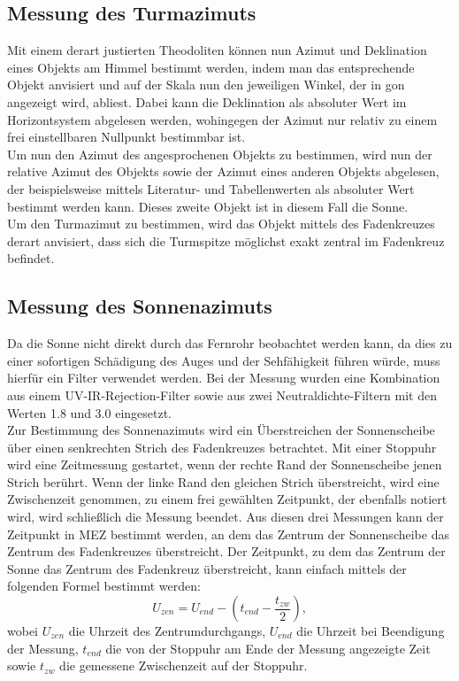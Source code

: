 \subsection{Messung des Turmazimuts}
Mit einem derart justierten Theodoliten können nun Azimut und Deklination eines Objekts am Himmel bestimmt werden, indem man das entsprechende Objekt anvisiert und auf der Skala nun den jeweiligen Winkel, der in gon angezeigt wird, abliest. Dabei kann die Deklination als absoluter Wert im Horizontsystem abgelesen werden, wohingegen der Azimut nur relativ zu einem frei einstellbaren Nullpunkt bestimmbar ist. \\
Um nun den Azimut des angesprochenen Objekts zu bestimmen, wird nun der relative Azimut des Objekts sowie der Azimut eines anderen Objekts abgelesen, der beispielsweise mittels Literatur- und Tabellenwerten als absoluter Wert bestimmt werden kann. Dieses zweite Objekt ist in diesem Fall die Sonne. \\
Um den Turmazimut zu bestimmen, wird das Objekt mittels des Fadenkreuzes derart anvisiert, dass sich die Turmspitze möglichst exakt zentral im Fadenkreuz befindet. \\

\subsection{Messung des Sonnenazimuts}
Da die Sonne nicht direkt durch das Fernrohr beobachtet werden kann, da dies zu einer sofortigen Schädigung des Auges und der Sehfähigkeit führen würde, muss hierfür ein Filter verwendet werden. Bei der Messung wurden eine Kombination aus einem UV-IR-Rejection-Filter sowie aus zwei Neutraldichte-Filtern mit den Werten 1.8 und 3.0 eingesetzt. \\ 
Zur Bestimmung des Sonnenazimuts wird ein Überstreichen der Sonnenscheibe über einen senkrechten Strich des Fadenkreuzes betrachtet. Mit einer Stoppuhr wird eine Zeitmessung gestartet, wenn der rechte Rand der Sonnenscheibe jenen Strich berührt. Wenn der linke Rand den gleichen Strich überstreicht, wird eine Zwischenzeit genommen, zu einem frei gewählten Zeitpunkt, der ebenfalls notiert wird, wird schließlich die Messung beendet. Aus diesen drei Messungen kann der Zeitpunkt in MEZ bestimmt werden, an dem das Zentrum der Sonnenscheibe das Zentrum des Fadenkreuzes überstreicht. Der Zeitpunkt, zu dem das Zentrum der Sonne das Zentrum des Fadenkreuz überstreicht, kann einfach mittels der folgenden Formel bestimmt werden: 
\begin{equation}
U_{zen} = U_{end} - (t_{end} - \frac {t_{zw}}{2}), 
\end{equation}
wobei $U_{zen}$ die Uhrzeit des Zentrumdurchgangs, $U_{end}$ die Uhrzeit bei Beendigung der Messung, $t_{end}$ die von der Stoppuhr am Ende der Messung angezeigte Zeit sowie $t_{zw}$ die gemessene Zwischenzeit auf der Stoppuhr. 

